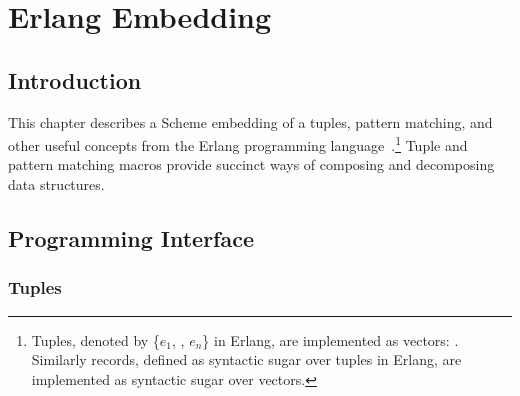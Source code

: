 %
%
%

\chapter {Erlang Embedding}\label{chap:erlang}

\section {Introduction}

This chapter describes a Scheme embedding of a tuples, pattern
matching, and other useful concepts from the Erlang programming
language~\cite{armstrong-thesis,programming-erlang}.\footnote{Tuples,
denoted by \{$e_1$, \etc, $e_n$\} in Erlang, are implemented as
vectors: . Similarly records,
defined as syntactic sugar over tuples in Erlang, are implemented as
syntactic sugar over vectors.}  Tuple and pattern matching macros
provide succinct ways of composing and decomposing data structures.

\section {Programming Interface}\label{sec:erlang-api}

\subsection {Tuples}

